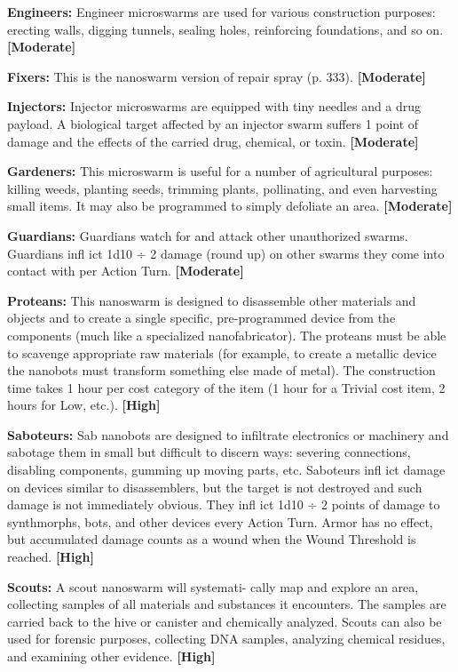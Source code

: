 \textbf{Engineers:} Engineer microswarms are used for 
various construction purposes: erecting walls, digging 
tunnels, sealing holes, reinforcing foundations, and so 
on. \textbf{[Moderate]}

\textbf{Fixers:} This is the nanoswarm version of repair 
spray (p. 333). \textbf{[Moderate]}

\textbf{Injectors:} Injector microswarms are equipped with 
tiny needles and a drug payload. A biological target 
affected by an injector swarm suffers 1 point of 
damage and the effects of the carried drug, chemical, 
or toxin. \textbf{[Moderate]}

\textbf{Gardeners:} This microswarm is useful for a number 
of agricultural purposes: killing weeds, planting seeds, 
trimming plants, pollinating, and even harvesting 
small items. It may also be programmed to simply 
defoliate an area. \textbf{[Moderate]}

\textbf{Guardians:} Guardians watch for and attack other 
unauthorized swarms. Guardians infl ict 1d10 ÷ 2 
damage (round up) on other swarms they come into 
contact with per Action Turn. \textbf{[Moderate]}

\textbf{Proteans:} This nanoswarm is designed to disassemble 
other materials and objects and to create a single specific, 
pre-programmed device from the components (much 
like a specialized nanofabricator). The proteans must be 
able to scavenge appropriate raw materials (for example, 
to create a metallic device the nanobots must transform 
something else made of metal). The construction time 
takes 1 hour per cost category of the item (1 hour for a 
Trivial cost item, 2 hours for Low, etc.). \textbf{[High]}

\textbf{Saboteurs:} Sab nanobots are designed to infiltrate 
electronics or machinery and sabotage them in small 
but difficult to discern ways: severing connections, 
disabling components, gumming up moving parts, 
etc. Saboteurs infl ict damage on devices similar to 
disassemblers, but the target is not destroyed and 
such damage is not immediately obvious. They infl ict 
1d10 ÷ 2 points of damage to synthmorphs, bots, and 
other devices every Action Turn. Armor has no effect, 
but accumulated damage counts as a wound when the 
Wound Threshold is reached. \textbf{[High]}

\textbf{Scouts:} A scout nanoswarm will systemati-
cally map and explore an area, collecting samples 
of all materials and substances it encounters. The 
samples are carried back to the hive or canister 
and chemically analyzed. Scouts can also be used 
for forensic purposes, collecting DNA samples, 
analyzing chemical residues, and examining other 
evidence. \textbf{[High]}

